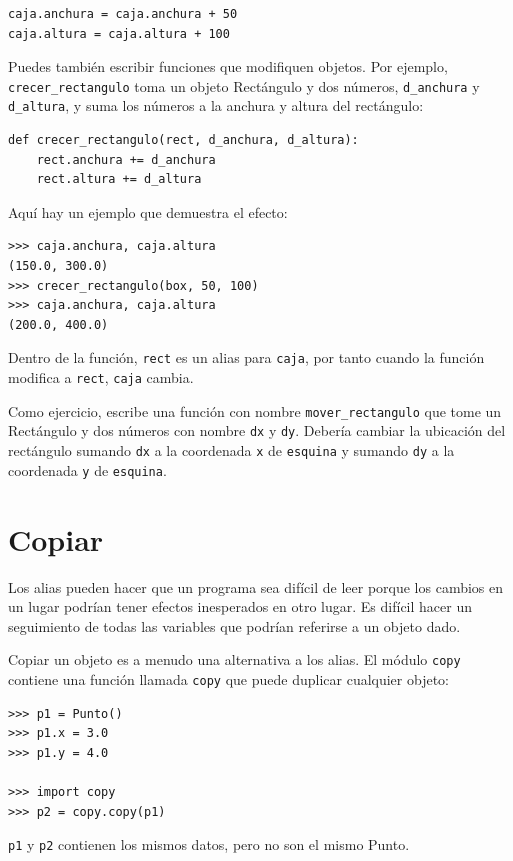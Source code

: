 \documentclass[10pt]{book}
\begin{document}
\begin{verbatim}
caja.anchura = caja.anchura + 50
caja.altura = caja.altura + 100
\end{verbatim}
%
Puedes también escribir funciones que modifiquen objetos.  Por ejemplo,
\verb"crecer_rectangulo" toma un objeto Rectángulo y dos números,
{\tt d\_anchura} y {\tt d\_altura}, y suma los números a la
anchura y altura del rectángulo:

\begin{verbatim}
def crecer_rectangulo(rect, d_anchura, d_altura):
    rect.anchura += d_anchura
    rect.altura += d_altura
\end{verbatim}
%
Aquí hay un ejemplo que demuestra el efecto:

\begin{verbatim}
>>> caja.anchura, caja.altura
(150.0, 300.0)
>>> crecer_rectangulo(box, 50, 100)
>>> caja.anchura, caja.altura
(200.0, 400.0)
\end{verbatim}
%
Dentro de la función, {\tt rect} es un
alias para {\tt caja}, por tanto cuando la función modifica a {\tt rect},
{\tt caja} cambia.

Como ejercicio, escribe una función con nombre \verb"mover_rectangulo" que tome
un Rectángulo y dos números con nombre {\tt dx} y {\tt dy}.  Debería
cambiar la ubicación del rectángulo sumando {\tt dx}
a la coordenada {\tt x} de {\tt esquina} y sumando {\tt dy}
a la coordenada {\tt y} de {\tt esquina}.


\section{Copiar}
\label{copying}

Los alias pueden hacer que un programa sea difícil de leer porque los cambios
en un lugar podrían tener efectos inesperados en otro lugar.
Es difícil hacer un seguimiento de todas las variables que podrían referirse
a un objeto dado.

Copiar un objeto es a menudo una alternativa a los alias.
El módulo {\tt copy} contiene una función llamada {\tt copy} que
puede duplicar cualquier objeto:

\begin{verbatim}
>>> p1 = Punto()
>>> p1.x = 3.0
>>> p1.y = 4.0

>>> import copy
>>> p2 = copy.copy(p1)
\end{verbatim}
%
{\tt p1} y {\tt p2} contienen los mismos datos, pero no son
el mismo Punto.
\end{document}
